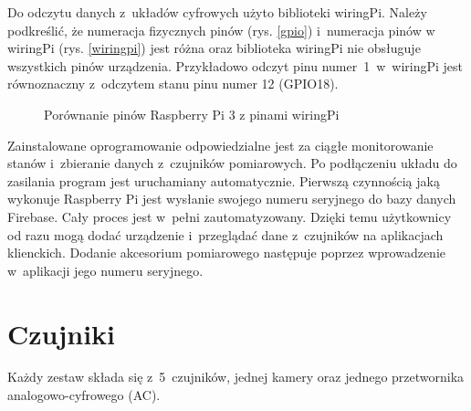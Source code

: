 Do odczytu danych z~układów cyfrowych użyto biblioteki wiringPi. Należy podkreślić, że numeracja fizycznych pinów (rys. \ref{gpio}) i~numeracja pinów w wiringPi (rys. \ref{wiringpi}) jest różna oraz biblioteka wiringPi nie obsługuje wszystkich pinów urządzenia. Przykładowo odczyt pinu numer~1~w~wiringPi jest równoznaczny z~odczytem stanu pinu numer 12 (GPIO18).
\begin{figure}[H]
    \centering
    \hspace{3cm} 
    \caption{Porównanie pinów Raspberry Pi 3 \cite{gpio} z pinami wiringPi \cite{wiringpi}}
    \label{piny}
\end{figure}

Zainstalowane oprogramowanie odpowiedzialne jest za ciągłe monitorowanie stanów i~zbieranie danych z~czujników pomiarowych. Po podłączeniu układu do zasilania program jest uruchamiany automatycznie. Pierwszą czynnością jaką wykonuje Raspberry Pi jest wysłanie swojego numeru seryjnego do bazy danych Firebase. Cały proces jest w~pełni zautomatyzowany. Dzięki temu użytkownicy od razu mogą dodać urządzenie i~przeglądać dane z~czujników na aplikacjach klienckich. Dodanie akcesorium pomiarowego następuje poprzez wprowadzenie w~aplikacji jego numeru seryjnego.
\section{Czujniki}
Każdy zestaw składa się z~5~czujników, jednej kamery oraz jednego przetwornika analogowo-cyfrowego (AC). 
